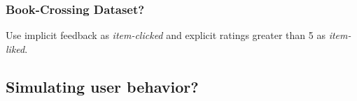 
\subsubsection{Book-Crossing Dataset?}

Use implicit feedback as \emph{item-clicked} and explicit ratings greater than 5 as \emph{item-liked}.

\subsection{Simulating user behavior?}




